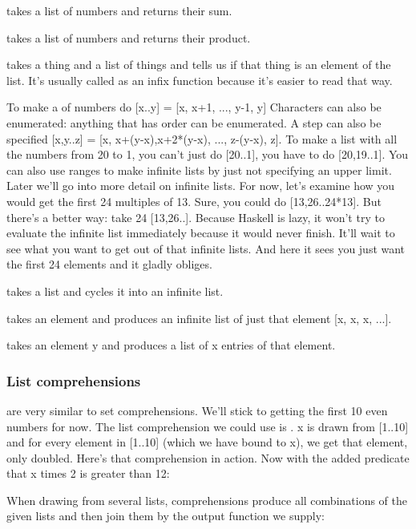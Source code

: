 \begin{compactitem}
\item {} takes a list of numbers and returns their sum.
\item {} takes a list of numbers and returns their product.
\item {} takes a thing and a list of things and tells us if that thing is an element of the list. It's usually called as an infix function because it's easier to read that way.
\item To make a  of numbers do [x..y] = [x, x+1, ..., y-1, y]
Characters can also be enumerated: anything that has order can be enumerated.
A step can also be specified [x,y..z] = [x, x+(y-x),x+2*(y-x), ..., z-(y-x), z]. To make a list with all the numbers from 20 to 1, you can't just do [20..1], you have to do [20,19..1]. You can also use ranges to make infinite lists by just not specifying an upper limit. Later we'll go into more detail on infinite lists. For now, let's examine how you would get the first 24 multiples of 13. Sure, you could do [13,26..24*13]. But there's a better way: take 24 [13,26..]. Because Haskell is lazy, it won't try to evaluate the infinite list immediately because it would never finish. It'll wait to see what you want to get out of that infinite lists. And here it sees you just want the first 24 elements and it gladly obliges.
\item {} takes a list  and cycles it into an infinite list. 
\item {} takes an element  and produces an infinite list of just that element [x, x, x, ...]. 
\item {} takes an element y and produces a list of x entries of that element.
\end{compactitem}

\subsubsection{List comprehensions}
 are very similar to set comprehensions. We'll stick to getting the first 10 even numbers for now. The list comprehension we could use is \e{$[x*2 | x <- [1..10]]$}. x is drawn from [1..10] and for every element in [1..10] (which we have bound to x), we get that element, only doubled. Here's that comprehension in action.
Now with the added predicate that x times 2 is greater than 12: \e{$[x*2 | x <- [1..10], x*2 >= 12]$}

When drawing from several lists, comprehensions produce all combinations of the given lists and then join them by the output function we supply: \e{$[ x*y | x <- [2,5,10], y <- [8,10,11]]$}


